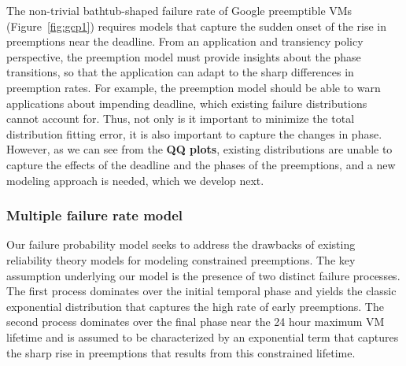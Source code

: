 



The non-trivial bathtub-shaped failure rate of Google preemptible VMs (Figure~\ref{fig:gcp1}) requires models that capture the sudden onset of the rise in preemptions near the deadline.
From an application and transiency policy perspective, the preemption model must provide insights about the phase transitions, so that the application can adapt to the sharp differences in preemption rates.
%
For example, the preemption model should be able to warn applications about impending deadline, which existing failure distributions cannot account for. 
Thus, not only is it important to minimize the total distribution fitting error, it is also important to capture the changes in phase.
However, as we can see from the \textbf{QQ plots}, existing distributions are unable to capture the effects of the deadline and the phases of the preemptions, and a new modeling approach is needed, which we develop next.  

\subsubsection{Multiple failure rate model}




Our failure probability model seeks to address the drawbacks of existing reliability theory models for modeling constrained preemptions. 
The key assumption underlying our model is the presence of two distinct failure processes.
The first process dominates over the initial temporal phase and yields the classic exponential distribution that captures the high rate of early preemptions.
The second process dominates over the final phase near the 24 hour maximum VM lifetime and is assumed to be characterized by an exponential term that captures the sharp rise in preemptions that results from this constrained lifetime. 

